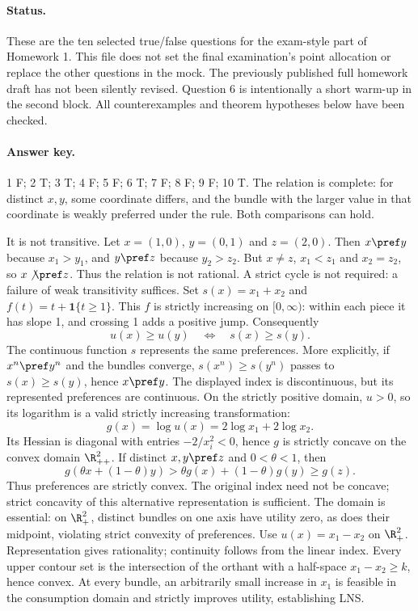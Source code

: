 \documentclass[11pt,a4paper]{article}
\begin{document}
\paragraph{Status.} These are the ten selected true/false questions for the exam-style part of Homework 1. This file does not set the final examination's point allocation or replace the other questions in the mock. The previously published full homework draft has not been silently revised. Question 6 is intentionally a short warm-up in the second block. All counterexamples and theorem hypotheses below have been checked.
\paragraph{Answer key.} 1 F; 2 T; 3 T; 4 F; 5 F; 6 T; 7 F; 8 F; 9 F; 10 T.
The relation is complete: for distinct $x,y$, some coordinate differs, and the bundle with the larger value in that coordinate is weakly preferred under the rule. Both comparisons can hold.

It is not transitive. Let $x=(1,0)$, $y=(0,1)$ and $z=(2,0)$. Then $x\pref y$ because $x_1>y_1$, and $y\pref z$ because $y_2>z_2$. But $x\ne z$, $x_1<z_1$ and $x_2=z_2$, so $x\not\pref z$. Thus the relation is not rational. A strict cycle is not required: a failure of weak transitivity suffices.
Set $s(x)=x_1+x_2$ and $f(t)=t+\mathbf1\{t\ge1\}$. This $f$ is strictly increasing on $[0,\infty)$: within each piece it has slope 1, and crossing 1 adds a positive jump. Consequently
\[
 u(x)\ge u(y)\quad\Longleftrightarrow\quad s(x)\ge s(y).
\]
The continuous function $s$ represents the same preferences. More explicitly, if $x^n\pref y^n$ and the bundles converge, $s(x^n)\ge s(y^n)$ passes to $s(x)\ge s(y)$, hence $x\pref y$. The displayed index is discontinuous, but its represented preferences are continuous.
On the strictly positive domain, $u>0$, so its logarithm is a valid strictly increasing transformation:
\[
 g(x)=\log u(x)=2\log x_1+2\log x_2.
\]
Its Hessian is diagonal with entries $-2/x_i^2<0$, hence $g$ is strictly concave on the convex domain $\R_{++}^2$. If distinct $x,y\pref z$ and $0<\theta<1$, then
\[
 g(\theta x+(1-\theta)y)>\theta g(x)+(1-\theta)g(y)\ge g(z).
\]
Thus preferences are strictly convex. The original index need not be concave; strict concavity of this alternative representation is sufficient. The domain is essential: on $\R_+^2$, distinct bundles on one axis have utility zero, as does their midpoint, violating strict convexity of preferences.
\clearpage
{}
Use $u(x)=x_1-x_2$ on $\R_+^2$. Representation gives rationality; continuity follows from the linear index. Every upper contour set is the intersection of the orthant with a half-space $x_1-x_2\ge k$, hence convex. At every bundle, an arbitrarily small increase in $x_1$ is feasible in the consumption domain and strictly improves utility, establishing LNS.
\end{document}
